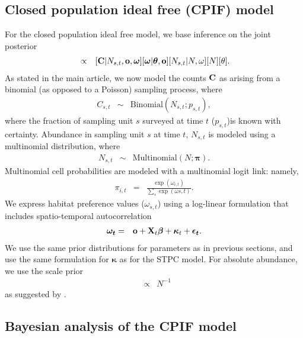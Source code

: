 \documentclass[12pt,fleqn]{article}
\begin{document}
\begin{flushleft}
\section{Closed population ideal free (CPIF) model}

For the closed population ideal free model, we base inference on the joint posterior
\begin{eqnarray}
  [N, N_{s,t}, \boldsymbol{\omega},\boldsymbol{\theta} | {\bf C},{\bf o},{\bf p}] & \propto & [{\bf C} | N_{s,t}, {\bf o}, \boldsymbol{\omega}] [\boldsymbol{\omega} | \boldsymbol{\theta},{\bf o}] [N_{s,t}|N,\omega] [N] [\theta].
  \label{eq:cpif-post}
\end{eqnarray}
As stated in the main article, we now model the counts ${\bf C}$ as arising from a binomial (as opposed to a Poisson) sampling process, where
\begin{eqnarray*}
  C_{s,t} & \sim & \textrm{Binomial}(N_{s,t}; p_{s,t}),
\end{eqnarray*}
where the fraction of sampling unit $s$ surveyed at time $t$ ($p_{s,t}$)is known with certainty.  Abundance in sampling unit $s$ at time $t$, $N_{s,t}$ is modeled using a multinomial distribution, where
\begin{eqnarray*}
  N_{s,t} & \sim & \textrm{Multinomial}(N; \boldsymbol{\pi}).
\end{eqnarray*}
Multinomial cell probabilities are modeled with a multinomial logit link: namely,
\begin{eqnarray*}
  \pi_{i,t} & = & \frac{\exp(\omega_{i,t})}{\sum_s \exp(\omega{s,t})}.
\end{eqnarray*}
We express habitat preference values ($\omega_{s,t}$) using a log-linear formulation that includes spatio-temporal autocorrelation
\begin{eqnarray*}
  \boldsymbol{\omega_t} & = & {\bf o} + {\bf X}_t \boldsymbol{\beta} + \boldsymbol{\kappa}_t + \boldsymbol{\epsilon_t}.
\end{eqnarray*}
We use the same prior distributions for parameters as in previous sections, and use the same formulation for $\boldsymbol{\kappa}$ as for the STPC model.  For absolute abundance, we use the scale prior
\begin{eqnarray*}
[N] & \propto & N^{-1}
\end{eqnarray*}
as suggested by \citet{Link2013}.

\subsection{Bayesian analysis of the CPIF model}


\end{flushleft}
\end{document}
